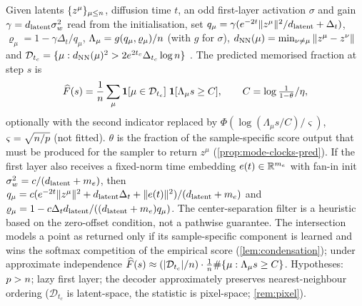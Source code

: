 \begin{definition}\label{def:two-source-predictor-pred}
Given latents $\{z^\mu\}_{\mu\le n}$, diffusion time $t$, an odd first-layer activation $\sigma$ and gain $\gamma=d_{\mathrm{latent}}\sigma_w^2$ read from the initialisation, set $q_\mu=\gamma(e^{-2t}\|z^\mu\|^2/d_{\mathrm{latent}}+\Delta_t)$, $\varrho_\mu=1-\gamma\Delta_t/q_\mu$, $\Lambda_\mu=g(q_\mu,\varrho_\mu)/n$ (with $g$ for $\sigma$), $d_{\rm NN}(\mu)=\min_{\nu\ne\mu}\|z^\mu-z^\nu\|$ and $\mathcal D_{t_c}=\{\mu:d_{\rm NN}(\mu)^2>2e^{2t_c}\Delta_{t_c}\log n\}$ \citep{biroli2024dynamical}. The predicted memorised fraction at step $s$ is
\[ \widehat F(s)=\frac1{n}\sum_\mu\mathbf 1[\mu\in\mathcal D_{t_c}]\;\mathbf 1[\Lambda_\mu s\ge C],\qquad C=\log\tfrac1{1-\theta}/\eta, \]
optionally with the second indicator replaced by $\Phi(\log(\Lambda_\mu s/C)/\varsigma)$, $\varsigma=\sqrt{n/p}$ (not fitted). $\theta$ is the fraction of the sample-specific score output that must be produced for the sampler to return $z^\mu$ (\cref{prop:mode-clocks-pred}). If the first layer also receives a fixed-norm time embedding $e(t)\in\mathbb{R}^{m_e}$ with fan-in init $\sigma_w^2=c/(d_{\mathrm{latent}}+m_e)$, then $q_\mu=c(e^{-2t}\|z^\mu\|^2+d_{\mathrm{latent}}\Delta_t+\|e(t)\|^2)/(d_{\mathrm{latent}}+m_e)$ and $\varrho_\mu=1-c\Delta_td_{\mathrm{latent}}/((d_{\mathrm{latent}}+m_e)q_\mu)$. The center-separation filter is a heuristic based on the zero-offset condition, not a pathwise guarantee. The intersection models a point as returned only if its sample-specific component is learned and wins the softmax competition of the empirical score (\cref{lem:condensation}); under approximate independence $\widehat F(s)\approx(|\mathcal D_{t_c}|/n)\cdot\frac1{n}\#\{\mu:\Lambda_\mu s\ge C\}$. Hypotheses: $p>n$; lazy first layer; the decoder approximately preserves nearest-neighbour ordering ($\mathcal D_{t_c}$ is latent-space, the statistic is pixel-space; \cref{rem:pixel}).
\end{definition}

